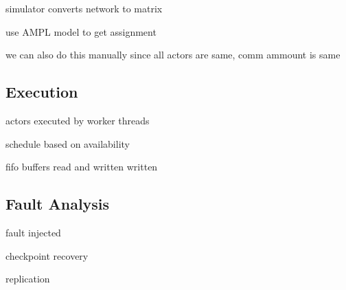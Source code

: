 simulator converts network to matrix

use AMPL model to get assignment

we can also do this manually since all actors are same, comm ammount is same

\subsection{Execution}

actors executed by worker threads

schedule based on availability

fifo buffers read and written written

\subsection{Fault Analysis}

fault injected

checkpoint recovery

replication